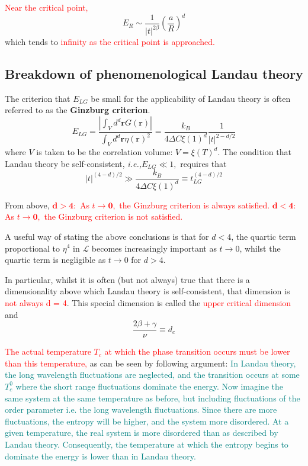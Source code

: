 \documentclass[12pt,titlepage]{article}
\newcommand{\redp}[1]{\textcolor{red}{#1}}
\newcommand{\tealp}[1]{\textcolor{teal}{#1}}
\numberwithin{equation}{section}
\begin{document}
\redp{Near the critical point,}
\begin{equation}
E_{R} \sim \frac{1}{|t|^{2 \beta}}\left(\frac{a}{R}\right)^{d}
\end{equation}
which tends to \redp{infinity as the critical point is approached.}

\subsection{Breakdown of phenomenological Landau theory}
The criterion that $E_{LG}$ be small for the applicability of Landau theory is often referred to as the \textbf{Ginzburg criterion}.
\begin{equation}
E_{L G}=\frac{\left|\int_{V} d^{d} \mathbf{r} G(\mathbf{r})\right|}{\int_{V} d^{d} \mathbf{r} \eta(\mathbf{r})^{2}}=\frac{k_{B}}{4 \Delta C \xi(1)^{d}} \frac{1}{|t|^{2-d / 2}}
\end{equation}
where $V$ is taken to be the correlation volume: $V=\xi(T)^{d}$. The condition that Landau theory be self-consistent, \textit{i.e.,}$E_{L G} \ll 1,$ requires that 
\begin{equation}
|t|^{(4-d) / 2} \gg \frac{k_{B}}{4 \Delta C \xi(1)^{d}} \equiv t_{L G}^{(4-d) / 2}
\end{equation}

From above, \redp{$\mathbf{d}>\mathbf{4} :$ As $t \rightarrow \mathbf{0},$ the Ginzburg criterion is always satisfied. $\mathbf{d}<\mathbf{4} :$ As $t \rightarrow \mathbf{0},$ the Ginzburg criterion is not satisfied.}

A useful way of stating the above conclusions is that for $d<4$, the quartic term proportional to $\eta^4$ in $\mathcal{L}$ becomes increasingly important as $t\rightarrow 0$, whilst the quartic term is negligible as $t\rightarrow 0$ for $d>4$.

In particular, whilst it is often (but not always) true that there is a dimensionality above which Landau theory is self-consistent, that dimension is \redp{not always d = 4}. This special dimension is called the \redp{upper critical dimension} and
\begin{equation}
\frac{2 \beta+\gamma}{\nu} \equiv d_{c}
\end{equation}

\redp{The actual temperature $T_c$ at which the phase transition occurs must be lower than this temperature,} as can be seen by following argument: \tealp{In Landau theory, the long wavelength fluctuations are neglected, and the transition occurs at some $T_{c}^{0}$ where the short range fluctuations dominate the energy. Now imagine the same system at the same temperature as before, but including fluctuations of the order parameter i.e. the long wavelength fluctuations. Since there are more fluctuations, the entropy will be higher, and the system more disordered. At a given temperature, the real system is more disordered than as described by Landau theory. Consequently, the temperature at which the entropy begins to dominate the energy is lower than in Landau theory.}
\end{document}
